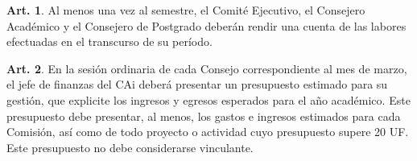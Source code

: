 \documentclass[letterpaper,11pt]{article}
\theoremstyle{definition}%
\newtheorem{art}{Art.} %
\begin{document}
\begin{art}\label{cuentasPublicasSemestrales}
	Al menos una vez al semestre, el Comité Ejecutivo, el Consejero Académico y el Consejero de Postgrado deberán rendir una cuenta de las labores efectuadas en el transcurso de su período.
\end{art}

\begin{art}\label{presupuestoEjecutivo}
	En la sesión ordinaria de cada Consejo correspondiente al mes de marzo, el jefe de finanzas del CAi deberá presentar un presupuesto estimado para su gestión, que explicite los ingresos y egresos esperados para el año académico. Este presupuesto debe presentar, al menos, los gastos e ingresos estimados para cada Comisión, así como de todo proyecto o actividad cuyo presupuesto supere 20 UF\@. Este presupuesto no debe considerarse vinculante.
\end{art}
\end{document}
